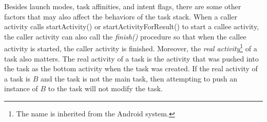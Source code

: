 Besides launch modes, task affinities, and intent flags, there are some other factors that may also affect the behaviors of the task stack. 
When a caller activity calls startActivity() or startActivityForResult() to start a callee activity, the caller activity can also call the \emph{finish()} procedure so that when the callee activity is started, the caller activity is finished. 
Moreover, the \emph{real activity}\footnote{The name is inherited from the Android system.} of a task also matters. The real activity of a task is the activity that was pushed into the task as the bottom activity when the task was created. 
If the real activity of a task is $B$ and the task is not the main task, then attempting to push an instance of $B$ to the task will not modify the task. 



